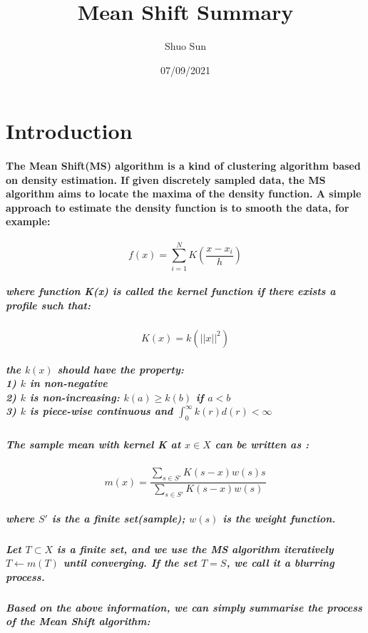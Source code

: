 \documentclass{article}
\title{Mean Shift Summary}
\author{Shuo Sun}
\date{07/09/2021}
\begin{document}
\maketitle

\section{Introduction}
\paragraph{
The Mean Shift(MS) algorithm is a kind of clustering algorithm based on density estimation. If given discretely sampled data, the MS algorithm aims to locate the maxima of the density function. A simple approach to estimate the density function is to smooth the data, for example:
}
\begin{equation}
f(x) = \sum_{i=1}^{N}K(\frac{x-x_{i}}{h})
\end{equation}

\subparagraph{
where function K(x) is called the \textit{kernel function} if there exists a profile such that:
}
\begin{equation}
K(x) = k(||x||^2)
\end{equation}

\subparagraph{
the $k(x)$ should have the property:\\
1) $k$ in non-negative\\
2) $k$ is non-increasing: $k(a) \geq k(b)$ if $a < b$\\
3) $k$ is piece-wise continuous and $\int_{0}^{\infty}k(r)d(r) < \infty $
}

\subparagraph{
The sample mean with kernel K at $x \in X$ can be written as :
}

\begin{equation}
m(x) = \frac{\sum_{s\in S'}K(s-x)w(s)s}{\sum_{s \in S'}K(s-x)w(s)}
\end{equation}

\subparagraph{
where $S'$ is the a finite set(sample); $w(s)$ is the weight function.
}

\subparagraph{
Let $T \subset  X$ is a finite set, and we use the MS algorithm iteratively  $T \leftarrow m(T)$ until converging.  If the set $T = S$, we call it a blurring process.
}

\subparagraph{
    Based on the above information, we can simply summarise the process of the Mean Shift algorithm:
}
\clearpage
\end{document}

